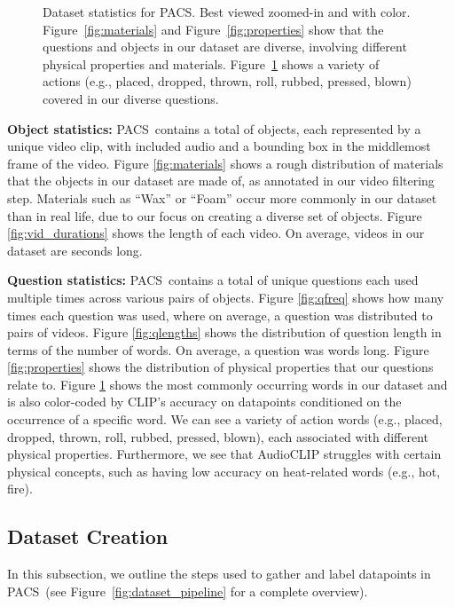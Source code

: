 \documentclass[runningheads]{llncs}
\newcommand{\names}{\textsc{PACS}}
\begin{document}
\begin{figure}[t!]
\begin{subfigure}{\textwidth}
      \label{fig:common_words}
    \end{subfigure}
    \caption{Dataset statistics for \names. Best viewed zoomed-in and with color. Figure~\ref{fig:materials} and Figure~\ref{fig:properties} show that the questions and objects in our dataset are diverse, involving different physical properties and materials. Figure~\ref{fig:common_words} shows a variety of actions (e.g., placed, dropped, thrown, roll, rubbed, pressed, blown) covered in our diverse questions.}
\label{fig:dataset_stats}
\end{figure}

\noindent \textbf{Object statistics:} \names\ contains a total of  objects, each represented by a unique video clip, with included audio and a bounding box in the middlemost frame of the video. Figure \ref{fig:materials} shows a rough distribution of materials that the objects in our dataset are made of, as annotated in our video filtering step. Materials such as ``Wax'' or ``Foam'' occur more commonly in our dataset than in real life, due to our focus on creating a diverse set of objects. Figure \ref{fig:vid_durations} shows the length of each video. On average, videos in our dataset are  seconds long.


\noindent \textbf{Question statistics:} \names\ contains a total of  unique questions each used multiple times across various pairs of objects. Figure \ref{fig:qfreq} shows how many times each question was used, where on average, a question was distributed to  pairs of videos. Figure \ref{fig:qlengths} shows the distribution of question length in terms of the number of words. On average, a question was  words long. Figure \ref{fig:properties} shows the distribution of physical properties that our questions relate to. Figure \ref{fig:common_words} shows the most commonly occurring words in our dataset and is also color-coded by CLIP's accuracy on datapoints conditioned on the occurrence of a specific word. We can see a variety of action words (e.g., placed, dropped, thrown, roll, rubbed, pressed, blown), each associated with different physical properties. Furthermore, we see that AudioCLIP struggles with certain physical concepts, such as having low accuracy on heat-related words (e.g., hot, fire).

\subsection{Dataset Creation}


In this subsection, we outline the steps used to gather and label datapoints in \names\ (see Figure~\ref{fig:dataset_pipeline} for a complete overview).
\end{document}

